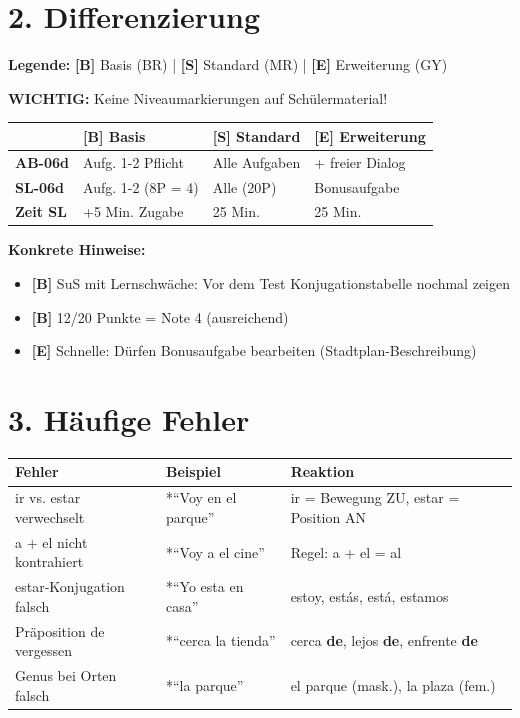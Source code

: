 \documentclass[11pt, a4paper]{article}
\newcommand{\B}{\textcolor{basis}{\textbf{[B]}}}
\newcommand{\Std}{\textcolor{standard}{\textbf{[S]}}}
\newcommand{\E}{\textcolor{erweiterung}{\textbf{[E]}}}
\begin{document}
\section*{2. Differenzierung}

\begin{differenzierung}
\textbf{Legende:} \B{} Basis (BR) | \Std{} Standard (MR) | \E{} Erweiterung (GY)

\textbf{WICHTIG:} Keine Niveaumarkierungen auf Schülermaterial!
\end{differenzierung}

\vspace{1em}

\begin{tabularx}{\textwidth}{|l|X|X|X|}
\hline
& \B{} \textbf{Basis} & \Std{} \textbf{Standard} & \E{} \textbf{Erweiterung} \\
\hline
\textbf{AB-06d} & Aufg. 1-2 Pflicht & Alle Aufgaben & + freier Dialog \\
\hline
\textbf{SL-06d} & Aufg. 1-2 (8P = 4) & Alle (20P) & Bonusaufgabe \\
\hline
\textbf{Zeit SL} & +5 Min. Zugabe & 25 Min. & 25 Min. \\
\hline
\end{tabularx}

\vspace{1em}

\textbf{Konkrete Hinweise:}
\begin{itemize}
    \item \B{} SuS mit Lernschwäche: Vor dem Test Konjugationstabelle nochmal zeigen
    \item \B{} 12/20 Punkte = Note 4 (ausreichend)
    \item \E{} Schnelle: Dürfen Bonusaufgabe bearbeiten (Stadtplan-Beschreibung)
\end{itemize}

\section*{3. Häufige Fehler}

\begin{fehlerbox}
\begin{tabularx}{\textwidth}{|l|X|X|}
\hline
\textbf{Fehler} & \textbf{Beispiel} & \textbf{Reaktion} \\
\hline
ir vs. estar verwechselt & *``Voy en el parque'' & ir = Bewegung ZU, estar = Position AN \\
\hline
a + el nicht kontrahiert & *``Voy a el cine'' & Regel: a + el = al \\
\hline
estar-Konjugation falsch & *``Yo esta en casa'' & estoy, estás, está, estamos \\
\hline
Präposition de vergessen & *``cerca la tienda'' & cerca \textbf{de}, lejos \textbf{de}, enfrente \textbf{de} \\
\hline
Genus bei Orten falsch & *``la parque'' & el parque (mask.), la plaza (fem.) \\
\hline
\end{tabularx}
\end{fehlerbox}
\end{document}
